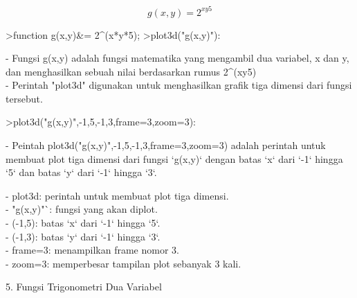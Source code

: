 \documentclass[a4paper,10pt]{article}
\begin{document}
\begin{eulernotebook}
\begin{eulercomment}
\begin{eulercomment}
\begin{eulercomment}
\begin{eulercomment}
\begin{eulercomment}
\begin{eulercomment}
\begin{eulercomment}
\begin{eulercomment}
\begin{eulercomment}
\end{eulercomment}
\begin{eulerformula}
\[
g(x,y) = 2^{xy5}
\]
\end{eulerformula}
\begin{eulerprompt}
>function g(x,y)&= 2^(x*y*5);
>plot3d("g(x,y)"):
\end{eulerprompt}
\begin{eulercomment}
- Fungsi g(x,y) adalah fungsi matematika yang mengambil dua variabel,
x dan y, dan menghasilkan sebuah nilai berdasarkan rumus 2\textasciicircum{}(xy5)\\
- Perintah "plot3d" digunakan untuk menghasilkan grafik tiga dimensi
dari fungsi tersebut.
\end{eulercomment}
\begin{eulerprompt}
>plot3d("g(x,y)",-1,5,-1,3,frame=3,zoom=3):
\end{eulerprompt}
\begin{eulercomment}
- Peintah plot3d("g(x,y)",-1,5,-1,3,frame=3,zoom=3) adalah perintah
untuk membuat plot tiga dimensi dari fungsi `g(x,y)` dengan batas `x`
dari `-1` hingga `5` dan batas `y` dari `-1` hingga `3`.

- plot3d: perintah untuk membuat plot tiga dimensi.\\
- "g(x,y)"`: fungsi yang akan diplot.\\
- (-1,5): batas `x` dari `-1` hingga `5`.\\
- (-1,3): batas `y` dari `-1` hingga `3`.\\
- frame=3: menampilkan frame nomor 3.\\
- zoom=3: memperbesar tampilan plot sebanyak 3 kali.

\end{eulercomment}
\eulersubheading{}
\begin{eulercomment}
5. Fungsi Trigonometri Dua Variabel


\end{eulercomment}
\end{eulercomment}
\end{eulercomment}
\end{eulercomment}
\end{eulercomment}
\end{eulercomment}
\end{eulercomment}
\end{eulercomment}
\end{eulercomment}
\end{eulernotebook}
\end{document}

